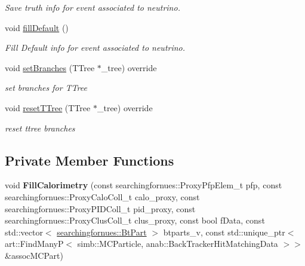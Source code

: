 \begin{DoxyCompactItemize}
\begin{DoxyCompactList}\small\item\em Save truth info for event associated to neutrino. \end{DoxyCompactList}\item 
void \hyperlink{classanalysis_1_1CalorimetryAnalysis_a724b38be467f664fcd7949c097daf8f0}{fill\+Default} ()\hypertarget{classanalysis_1_1CalorimetryAnalysis_a724b38be467f664fcd7949c097daf8f0}{}\label{classanalysis_1_1CalorimetryAnalysis_a724b38be467f664fcd7949c097daf8f0}

\begin{DoxyCompactList}\small\item\em Fill Default info for event associated to neutrino. \end{DoxyCompactList}\item 
void \hyperlink{classanalysis_1_1CalorimetryAnalysis_a65cbc0374aa07d5471f6fc1d2fa3a336}{set\+Branches} (T\+Tree $\ast$\+\_\+tree) override\hypertarget{classanalysis_1_1CalorimetryAnalysis_a65cbc0374aa07d5471f6fc1d2fa3a336}{}\label{classanalysis_1_1CalorimetryAnalysis_a65cbc0374aa07d5471f6fc1d2fa3a336}

\begin{DoxyCompactList}\small\item\em set branches for T\+Tree \end{DoxyCompactList}\item 
void \hyperlink{classanalysis_1_1CalorimetryAnalysis_adc92db8dddbb8a7e1cde1a25684f489e}{reset\+T\+Tree} (T\+Tree $\ast$\+\_\+tree) override\hypertarget{classanalysis_1_1CalorimetryAnalysis_adc92db8dddbb8a7e1cde1a25684f489e}{}\label{classanalysis_1_1CalorimetryAnalysis_adc92db8dddbb8a7e1cde1a25684f489e}

\begin{DoxyCompactList}\small\item\em reset ttree branches \end{DoxyCompactList}\end{DoxyCompactItemize}
\subsection*{Private Member Functions}
\begin{DoxyCompactItemize}
\item 
void {\bfseries Fill\+Calorimetry} (const searchingfornues\+::\+Proxy\+Pfp\+Elem\+\_\+t pfp, const searchingfornues\+::\+Proxy\+Calo\+Coll\+\_\+t calo\+\_\+proxy, const searchingfornues\+::\+Proxy\+P\+I\+D\+Coll\+\_\+t pid\+\_\+proxy, const searchingfornues\+::\+Proxy\+Clus\+Coll\+\_\+t clus\+\_\+proxy, const bool f\+Data, const std\+::vector$<$ \hyperlink{structsearchingfornues_1_1BtPart}{searchingfornues\+::\+Bt\+Part} $>$ btparts\+\_\+v, const std\+::unique\+\_\+ptr$<$ art\+::\+Find\+ManyP$<$ simb\+::\+M\+C\+Particle, anab\+::\+Back\+Tracker\+Hit\+Matching\+Data $>$$>$ \&assoc\+M\+C\+Part)\hypertarget{classanalysis_1_1CalorimetryAnalysis_ace6489df3503462c25bea5ae3837abae}{}\label{classanalysis_1_1CalorimetryAnalysis_ace6489df3503462c25bea5ae3837abae}

\end{DoxyCompactItemize}
